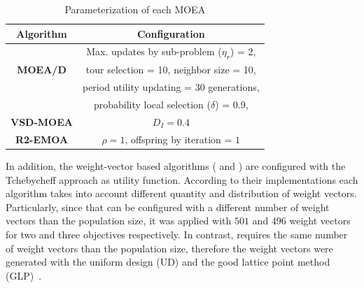 %
%
%
%
%
%
%

%
\begin{table}[t]
\centering
\caption{Parameterization of each MOEA}
\label{tab:Parametrization}
\begin{tabular}{c|c}
\hline
\textbf{Algorithm} & \textbf{Configuration} \\ \hline
\multirow{3}{*}{\textbf{MOEA/D}} &Max. updates by sub-problem ($\eta_r$) = 2, \\
 & tour selection = 10,   neighbor size = 10, \\
 & period utility updating = 30 generations, \\ 
 & probability local selection ($\delta$) = 0.9,\\ \hline
\textbf{VSD-MOEA} & $D_I=0.4$ \\ \hline
\textbf{R2-EMOA} & $\rho=1$, offspring by iteration = $1$ \\ \hline
\end{tabular}
\end{table}


%

In addition, the weight-vector based algorithms (\MOEAD{} and \RMOEA{}) are configured with the Tchebycheff approach as utility function.
%
According to their implementations each algorithm takes into account different quantity and distribution of weight vectors.
%
Particularly, since that \RMOEA{} can be configured with a different number of weight vectors than the population size, it was applied with $501$ and $496$ weight vectors for two and three objectives respectively.
%
In contrast, \MOEAD{} requires the same number of weight vectors than the population size, therefore the weight vectors were generated with the uniform design (UD) and the good lattice point method (GLP)~\cite{Joel:MOEAD_Uniform_Design, Joel:Kuhn_Munkres}.

